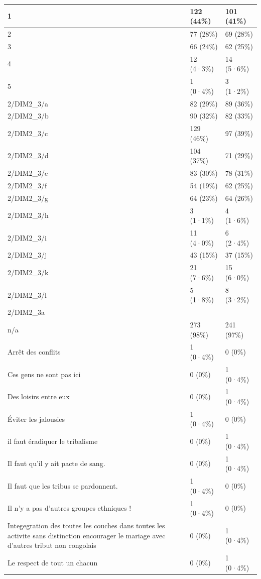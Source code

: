\documentclass[
]{book}
\begin{document}
\begin{tabular}{l|l|l}
\hline
1 & 122 (44\%) & 101 (41\%)\\
\hline
2 & 77 (28\%) & 69 (28\%)\\
\hline
3 & 66 (24\%) & 62 (25\%)\\
\hline
4 & 12 (4·3\%) & 14 (5·6\%)\\
\hline
5 & 1 (0·4\%) & 3 (1·2\%)\\
\hline
2/DIM2\_3/a & 82 (29\%) & 89 (36\%)\\
\hline
2/DIM2\_3/b & 90 (32\%) & 82 (33\%)\\
\hline
2/DIM2\_3/c & 129 (46\%) & 97 (39\%)\\
\hline
2/DIM2\_3/d & 104 (37\%) & 71 (29\%)\\
\hline
2/DIM2\_3/e & 83 (30\%) & 78 (31\%)\\
\hline
2/DIM2\_3/f & 54 (19\%) & 62 (25\%)\\
\hline
2/DIM2\_3/g & 64 (23\%) & 64 (26\%)\\
\hline
2/DIM2\_3/h & 3 (1·1\%) & 4 (1·6\%)\\
\hline
2/DIM2\_3/i & 11 (4·0\%) & 6 (2·4\%)\\
\hline
2/DIM2\_3/j & 43 (15\%) & 37 (15\%)\\
\hline
2/DIM2\_3/k & 21 (7·6\%) & 15 (6·0\%)\\
\hline
2/DIM2\_3/l & 5 (1·8\%) & 8 (3·2\%)\\
\hline
2/DIM2\_3a &  & \\
\hline
n/a & 273 (98\%) & 241 (97\%)\\
\hline
Arrêt des conflits & 1 (0·4\%) & 0 (0\%)\\
\hline
Ces gens ne sont pas ici & 0 (0\%) & 1 (0·4\%)\\
\hline
Des loisirs entre eux & 0 (0\%) & 1 (0·4\%)\\
\hline
Éviter les jalousies & 1 (0·4\%) & 0 (0\%)\\
\hline
il faut éradiquer le tribalisme & 0 (0\%) & 1 (0·4\%)\\
\hline
Il faut qu'il y ait pacte de sang. & 0 (0\%) & 1 (0·4\%)\\
\hline
Il faut que les tribus se pardonnent. & 1 (0·4\%) & 0 (0\%)\\
\hline
Il n'y a pas d'autres groupes ethniques ! & 1 (0·4\%) & 0 (0\%)\\
\hline
Integegration des toutes les couches dans toutes les activite sans distinction encourager le mariage avec d'autres tribut non congolais & 0 (0\%) & 1 (0·4\%)\\
\hline
Le respect de tout un  chacun & 0 (0\%) & 1 (0·4\%)\\

\end{tabular}
\end{document}
